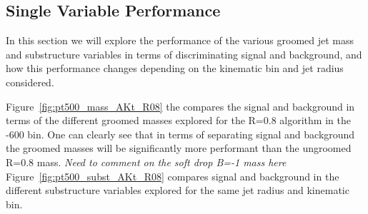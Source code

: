 \subsection{Single Variable Performance}

In this section we will explore the performance of the various groomed
jet mass and substructure variables in terms of discriminating signal
and background, and how this performance changes depending on the
kinematic bin and jet radius considered.

Figure~\ref{fig:pt500_mass_AKt_R08} the compares the signal and
background in terms of the different groomed masses explored for the
\antikt R=0.8 algorithm in the -600 bin. One can clearly see
that in terms of separating signal and background the groomed masses
will be significantly more performant than the ungroomed \antikt R=0.8
mass. {\it Need to comment on the soft drop B=-1 mass here}
Figure~\ref{fig:pt500_subst_AKt_R08}
compares signal and background in the different substructure variables
explored for the same jet radius and kinematic bin. 

